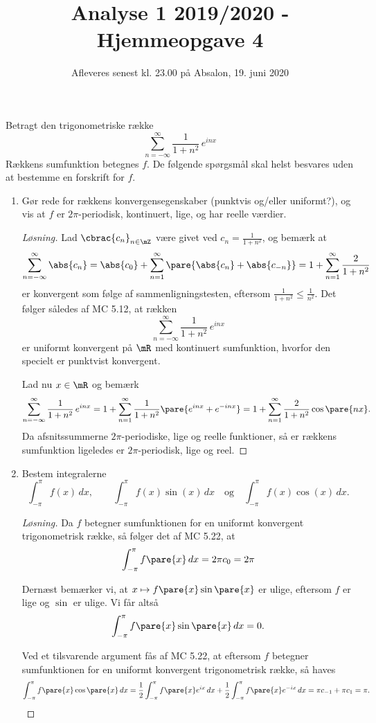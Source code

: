 \documentclass{article}
\title{Analyse 1 2019/2020 - Hjemmeopgave 4}
\author{}
\date{\vspace{-1cm}Afleveres senest kl. 23.00 på Absalon, 19. juni 2020}
\begin{document}
\maketitle

\noindent

\begin{opg}
Betragt den trigonometriske række
$$
\sum_{n=-\infty}^\infty\frac1{1+n^2}\,e^{inx}
$$
Rækkens sumfunktion betegnes $f$. De følgende spørgsmål skal helst besvares uden at bestemme en forskrift for $f$.
\begin{enumerate}
\item Gør rede for rækkens konvergensegenskaber (punktvis og/eller uniformt?), 
og vis at $f$ er $2\pi$-periodisk, kontinuert, lige, og har reelle værdier.

\begin{proof}[Løsning]
Lad $\cbrac{c_n}_{n\in\mZ}$ være givet ved $c_n = \frac{1}{1+n^2}$, og bemærk at
$$ \sum_{n=-\infty}^\infty \abs{c_n}
    = \abs{c_0} + \sum_{n=1}^\infty \pare{\abs{c_n}+\abs{c_{-n}}} 
    = 1 + \sum_{n=1}^\infty \frac{2}{1+n^2} $$
er konvergent som følge af sammenligningstesten, eftersom $\frac{1}{1+n^2}\leq \frac{1}{n^2}$. Det følger således af MC 5.12, at rækken
$$ \sum_{n=-\infty}^\infty\frac1{1+n^2}\,e^{inx} $$
er uniformt konvergent på $\mR$ med kontinuert sumfunktion, hvorfor den specielt er punktvist konvergent.

Lad nu $x\in\mR$ og bemærk
$$ \sum_{n=-\infty}^\infty\frac1{1+n^2}\,e^{inx}
    = 1 + \sum_{n=1}^\infty \frac{1}{1+n^2}\pare{e^{inx} + e^{-inx}} 
    = 1 + \sum_{n=1}^\infty \frac{2}{1+n^2}\cos\pare{nx}. $$
Da afsnitssummerne $2\pi$-periodiske, lige og reelle funktioner, så er rækkens sumfunktion ligeledes er $2\pi$-periodisk, lige og reel. 
\end{proof}

\item Bestem integralerne 
$$ \int_{-\pi}^\pi f(x)\,dx,\quad\quad \int_{-\pi}^\pi f(x)\sin(x)\,dx \quad \text{og}\quad \int_{-\pi}^\pi  f(x)\cos(x)\,dx . $$

\begin{proof}[Løsning]
Da $f$ betegner sumfunktionen for en uniformt konvergent trigonometrisk række, så følger det af MC 5.22, at
$$ \int_{-\pi}^\pi f\pare{x} \, dx = 2\pi c_0 = 2\pi $$

Dernæst bemærker vi, at $x\mapsto f\pare{x}\sin\pare{x}$ er ulige, eftersom $f$ er lige og $\sin$ er ulige. Vi får altså
$$ \int_{-\pi}^\pi f\pare{x}\sin\pare{x} \, dx = 0. $$

Ved et tilsvarende argument fås af MC 5.22, at eftersom $f$ betegner sumfunktionen for en uniformt konvergent trigonometrisk række, så haves
$$ \int_{-\pi}^\pi f\pare{x}\cos\pare{x} \, dx 
    = \frac{1}{2}\int_{-\pi}^\pi f\pare{x}e^{ix} \, dx 
        + \frac{1}{2}\int_{-\pi}^\pi f\pare{x}e^{-ix} \, dx 
    = \pi c_{-1} + \pi c_1 = \pi. $$
\end{proof}
\end{enumerate}
\end{opg}
\end{document}
